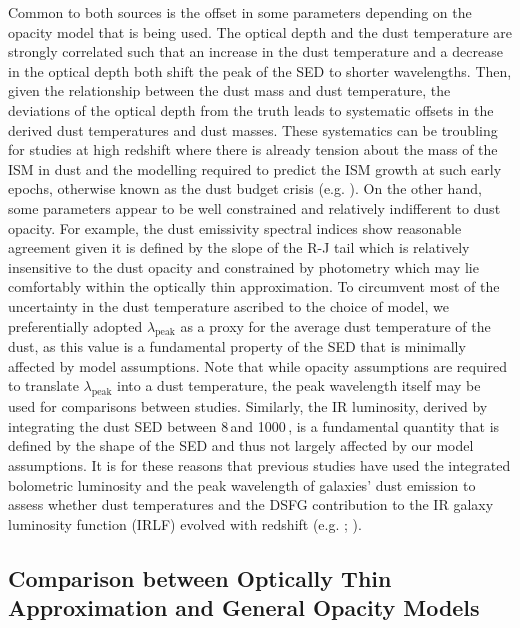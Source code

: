 Common to both sources is the offset in some parameters depending on the opacity model that is being used. The optical depth and the dust temperature are strongly correlated such that an increase in the dust temperature and a decrease in the optical depth both shift the peak of the SED to shorter wavelengths. Then, given the relationship between the dust mass and dust temperature,  the deviations of the optical depth from the truth leads to systematic offsets in the derived dust temperatures and dust masses. These systematics can be troubling for studies at high redshift where there is already tension about the mass of the ISM in dust and the modelling required to predict the ISM growth at such early epochs, otherwise known as the dust budget crisis (e.g. \citealt{Rowlands_2014}). On the other hand, some parameters appear to be well constrained and relatively indifferent to dust opacity. For example, the dust emissivity spectral indices show reasonable agreement given it is defined by the slope of the R-J tail which is relatively insensitive to the dust opacity and constrained by photometry which may lie comfortably within the optically thin approximation. To circumvent most of the uncertainty in the dust temperature ascribed to the choice of model, we preferentially adopted $\lambda_\textrm{peak}$ as a proxy for the average dust temperature of the dust, as this value is a fundamental property of the SED that is minimally affected by model assumptions. Note that while opacity assumptions are required to translate $\lambda_\textrm{peak}$ into a dust temperature, the peak wavelength itself may be used for comparisons between studies. Similarly, the IR luminosity, derived by integrating the dust SED between 8\,\micron and 1000\,\micron, is a fundamental quantity that is defined by the shape of the SED and thus not largely affected by our model assumptions. It is for these reasons that previous studies have used the integrated bolometric luminosity and the peak wavelength of galaxies' dust emission to assess whether dust temperatures and the DSFG contribution to the IR galaxy luminosity function (IRLF) evolved with redshift (e.g. \citealt{Casey_2018}; \citealt{Drew_2022}).

\subsection{Comparison between Optically Thin Approximation and General Opacity Models}
\label{sec:comparison_optically_thin_and_general_opacity}

